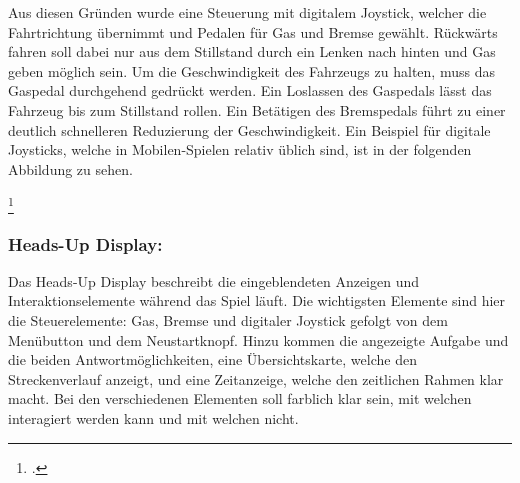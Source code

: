		Aus diesen Gründen wurde eine Steuerung mit digitalem Joystick, welcher die Fahrtrichtung übernimmt und Pedalen für Gas und Bremse gewählt. Rückwärts fahren soll dabei nur aus dem Stillstand durch ein Lenken nach hinten und Gas geben möglich sein.
		Um die Geschwindigkeit des Fahrzeugs zu halten, muss das Gaspedal durchgehend gedrückt werden.
		Ein Loslassen des Gaspedals lässt das Fahrzeug bis zum Stillstand rollen. Ein Betätigen des Bremspedals führt zu einer deutlich schnelleren Reduzierung der Geschwindigkeit.
		Ein Beispiel für digitale Joysticks, welche in Mobilen-Spielen relativ üblich sind, ist in der folgenden Abbildung zu sehen.

		\footcitetext[\url{http://www2.ea.com/uk/fifa-11-iphone/images/f784dabc26b7b210VgnVCM2000001165140aRCRD}]{easports}

	\subsubsection*{Heads-Up Display:}
			Das Heads-Up Display beschreibt die eingeblendeten Anzeigen und Interaktionselemente während das Spiel läuft.
			Die wichtigsten Elemente sind hier die Steuerelemente: Gas, Bremse und digitaler Joystick gefolgt von dem Menübutton und dem Neustartknopf.
			Hinzu kommen die angezeigte Aufgabe und die beiden Antwortmöglichkeiten, eine Übersichtskarte, welche den Streckenverlauf anzeigt, und eine Zeitanzeige, welche den zeitlichen Rahmen klar macht.
			Bei den verschiedenen Elementen soll farblich klar sein, mit welchen interagiert werden kann und mit welchen nicht.

